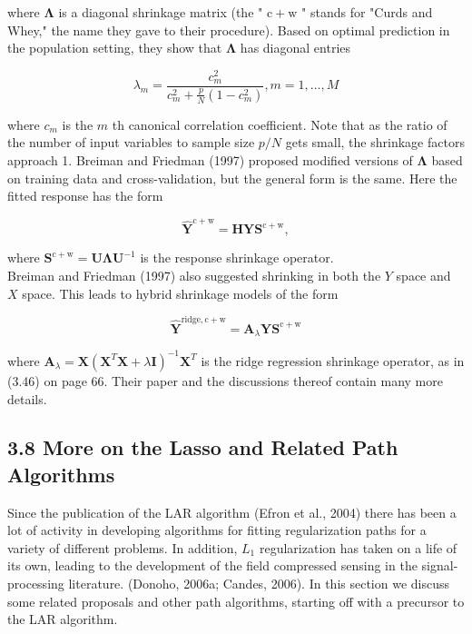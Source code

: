 \documentclass[10pt]{article}
\begin{document}
where $\boldsymbol{\Lambda}$ is a diagonal shrinkage matrix (the " $\mathrm{c}+\mathrm{w}$ " stands for "Curds and Whey," the name they gave to their procedure). Based on optimal prediction in the population setting, they show that $\boldsymbol{\Lambda}$ has diagonal entries


\begin{equation*}
\lambda_{m}=\frac{c_{m}^{2}}{c_{m}^{2}+\frac{p}{N}\left(1-c_{m}^{2}\right)}, m=1, \ldots, M \tag{3.73}
\end{equation*}


where $c_{m}$ is the $m$ th canonical correlation coefficient. Note that as the ratio of the number of input variables to sample size $p / N$ gets small, the shrinkage factors approach 1. Breiman and Friedman (1997) proposed modified versions of $\boldsymbol{\Lambda}$ based on training data and cross-validation, but the general form is the same. Here the fitted response has the form


\begin{equation*}
\hat{\mathbf{Y}}^{\mathrm{c}+\mathrm{w}}=\mathbf{H Y S}^{\mathrm{c}+\mathrm{w}}, \tag{3.74}
\end{equation*}


where $\mathbf{S}^{\mathrm{c}+\mathrm{w}}=\mathbf{U} \boldsymbol{\Lambda} \mathbf{U}^{-1}$ is the response shrinkage operator.\\
Breiman and Friedman (1997) also suggested shrinking in both the $Y$ space and $X$ space. This leads to hybrid shrinkage models of the form


\begin{equation*}
\hat{\mathbf{Y}}^{\mathrm{ridge}, \mathrm{c}+\mathrm{w}}=\mathbf{A}_{\lambda} \mathbf{Y} \mathbf{S}^{\mathrm{c}+\mathrm{w}} \tag{3.75}
\end{equation*}


where $\mathbf{A}_{\lambda}=\mathbf{X}\left(\mathbf{X}^{T} \mathbf{X}+\lambda \mathbf{I}\right)^{-1} \mathbf{X}^{T}$ is the ridge regression shrinkage operator, as in (3.46) on page 66. Their paper and the discussions thereof contain many more details.

\subsection*{3.8 More on the Lasso and Related Path Algorithms}
Since the publication of the LAR algorithm (Efron et al., 2004) there has been a lot of activity in developing algorithms for fitting regularization paths for a variety of different problems. In addition, $L_{1}$ regularization has taken on a life of its own, leading to the development of the field compressed sensing in the signal-processing literature. (Donoho, 2006a; Candes, 2006). In this section we discuss some related proposals and other path algorithms, starting off with a precursor to the LAR algorithm.
\end{document}
